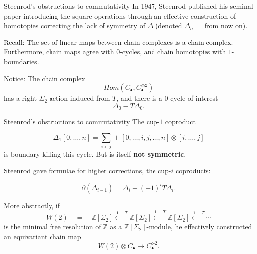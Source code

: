 \documentclass[10pt,t]{beamer}
\begin{document}
\begin{frame}{Steenrod's obstructions to commutativity}
	In 1947, Steenrod published his seminal paper introducing the square operations through an effective construction of homotopies correcting the lack of symmetry of $\Delta$ (denoted $\Delta_o = $ from now on).
	
	\vspace*{15pt} \pause
	
	\textcolor{pblue}{Recall:} The set of linear maps between chain complexes is a chain complex. Furthermore, chain maps agree with $0$-cycles, and chain homotopies with $1$-boundaries.

	\vspace*{15pt}\pause
	
	\textcolor{pblue}{Notice:} The chain complex
	\begin{equation*} \label{eq: complex of maps to the tensor product}
	Hom\left(C_\bullet, C_\bullet^{\otimes 2}  \right)
	\end{equation*}
	has a right $\Sigma_2$-action induced from $T$, and there is a $0$-cycle of interest
	\begin{equation*}
	\Delta_0 - T \Delta_0.
	\end{equation*}
\end{frame}



\begin{frame}{Steenrod's obstructions to commutativity}
	The cup-$1$ coproduct
	
	\begin{equation*}
	\Delta_1 [0, \dots, n] = \sum_{i<j} \pm [0, \dots, i, j, \dots, n] \otimes [i, \dots, j]
	\end{equation*}
	is boundary killing this cycle. But is itself \textbf{not symmetric}.
	
	\vspace*{10pt} \pause
	
	Steenrod gave formulae for higher corrections, the cup-$i$ coproducts:
	
	\begin{equation*}
	\partial (\Delta_{i+1}) = \Delta_i - (-1)^i T \Delta_i.
	\end{equation*}
	
	\vspace*{0pt}\pause
	
	More abstractly, if
	\begin{equation*}
	W(2) \quad = \quad \mathbb Z[\Sigma_2] \stackrel{\ 1-T}{\longleftarrow} \mathbb Z[\Sigma_2] \stackrel{\ 1+T}{\longleftarrow} \mathbb Z[\Sigma_2] \stackrel{\ 1-T}{\longleftarrow} \cdots
	\end{equation*}
	is the minimal free resolution of $\mathbb Z$ as a $\mathbb Z[\Sigma_2]$-module, he effectively constructed an equivariant chain map
	\begin{equation*}
	W(2) \otimes C_\bullet \to C_\bullet^{\otimes 2}.
	\end{equation*}
\end{frame}
\end{document}

